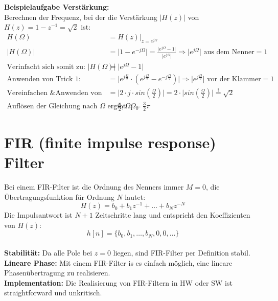 \textbf{Beispielaufgabe Verstärkung:\\} 
Berechnen der Frequenz, bei der die Verstärkung $\big|H(z)\big|$ von $H(z) = 1-z^{-1} =\sqrt{2}$ ist:
\begin{align*}
 H(\Omega)	 	&= H(z)\big|_{z=e^{j\Omega}} \\
\big| H(\Omega)\big| &= \big|1-e^{-j\Omega}\big| = \frac{\big|e^{j\Omega}-1\big|}{\big|e^{j\Omega}\big|} 
          \Longrightarrow \big|e^{j\Omega}\big| \text{ aus dem Nenner} = 1 \\
\text{Verinfacht sich somit zu: }	\big| H(\Omega)\big| &= \big|e^{j\Omega}-1\big| \\
\text{Anwenden von Trick 1:} 		&= \big| e^{j\frac{\Omega}{2}} \cdot (e^{j\frac{\Omega}{2}} - e^{-j\frac{\Omega}{2}})\big| 
          \Longrightarrow \big|e^{j\frac{\Omega}{2}}\big| \text{ vor der Klammer} = 1\\
\text{Vereinfachen \& Anwenden von Trick 2:} &= \big| 2\cdot j \cdot sin\left(\frac{\Omega}{2}\right) \big| = 2 \cdot \big| sin\left(\frac{\Omega}{2}\right) \big| \stackrel{!}{=} \sqrt{2} \\
\text{Auflösen der Gleichung nach } \Omega \text{ ergibt: } \Omega_0 &= \frac{\pi}{2}, \Omega_1 = \frac{3}{2}\pi
\end{align*}
\newpage

\section{FIR (finite impulse response) Filter}
Bei einem FIR-Filter ist die Ordnung des Nenners immer $M=0$, die
Übertragungsfunktion für Ordnung $N$ lautet:
\[ H(z) =b_0 + b_1z^{-1} + \ldots + b_Nz^{-N} \]
Die Impulsantwort ist $N+1$ Zeitschritte lang und entspricht den Koeffizienten
von $H(z)$:
\[ h[n] = \{ b_0,b_1,\ldots,b_N,0,0,\ldots \} \]\\
\textbf{Stabilität:} 
Da alle Pole bei $z=0$ liegen, sind FIR-Filter per Definition stabil.\\
\textbf{Lineare Phase:} 
Mit einem FIR-Filter is es einfach möglich, eine lineare Phasenübertragung
zu realisieren.\\
\textbf{Implementation:}
Die Realisierung von FIR-Filtern in HW oder SW ist straightforward und unkritisch.

